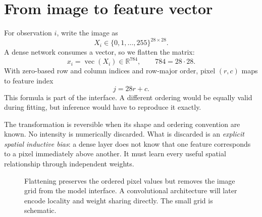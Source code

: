 
\section{From image to feature vector}

For observation $i$, write the image as
\[
  X_i\in\{0,1,\ldots,255\}^{28\times28}.
\]
A dense network consumes a vector, so we flatten the matrix:
\[
  x_i=\operatorname{vec}(X_i)\in\mathbb R^{784},
  \qquad 784=28\cdot28.
\]
With zero-based row and column indices and row-major order, pixel $(r,c)$ maps
to feature index
\[
  j=28r+c.
\]
This formula is part of the interface. A different ordering would be equally
valid during fitting, but inference would have to reproduce it exactly.

The transformation is reversible when its shape and ordering convention are
known. No intensity is numerically discarded. What is discarded is an
\emph{explicit spatial inductive bias}: a dense layer does not know that one
feature corresponds to a pixel immediately above another. It must learn every
useful spatial relationship through independent weights.

\begin{figure}[htbp]
\centering
{}
\caption{Flattening preserves the ordered pixel values but removes the image
grid from the model interface. A convolutional architecture will later encode
locality and weight sharing directly. The small grid is schematic.}
\label{fig:mnist-flattening}
\end{figure}

